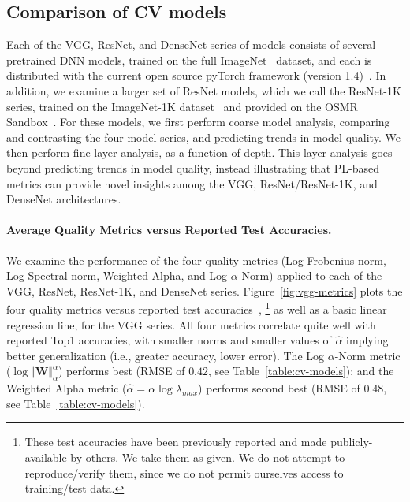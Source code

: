 \subsection{Comparison of CV models}
\label{sxn:cv}

Each of the VGG, ResNet, and DenseNet series of models consists of several pretrained DNN models, trained on the full ImageNet~\cite{imagenet} dataset, and each is distributed with the current open source pyTorch framework (version 1.4)~\cite{pytorch}.
In addition, we examine a larger set of ResNet models, which we call the ResNet-1K series, trained on the ImageNet-1K dataset~\cite{imagenet} and provided on the OSMR Sandbox~\cite{osmr}.
For these models, we first perform coarse model analysis, comparing and contrasting the four model series, and predicting trends in model quality.
We then perform fine layer analysis, as a function of depth.
This layer analysis goes beyond predicting trends in model quality, instead illustrating that PL-based metrics can provide novel insights among the VGG, ResNet/ResNet-1K, and DenseNet architectures. 


\paragraph{Average Quality Metrics versus Reported Test Accuracies.}

We examine the performance of the four quality metrics (Log Frobenius norm, Log Spectral norm, Weighted Alpha, and Log $\alpha$-Norm) applied to each of the VGG, ResNet, ResNet-1K, and DenseNet series.
Figure~\ref{fig:vgg-metrics} 
plots the four quality metrics versus reported test accuracies~\cite{pytorch},%
\footnote{These test accuracies have been previously reported and made publicly-available by others.  We take them as given.  We do not attempt to reproduce/verify them, since we do not permit ourselves access to training/test data.}
as well as a basic linear regression line, for the VGG series.
All four metrics correlate quite well with reported Top1 accuracies, with smaller norms and smaller values of $\hat{\alpha}$ implying better generalization (i.e., greater accuracy, lower error). 
The Log $\alpha$-Norm metric ($\log\Vert\mathbf{W}\Vert_{\alpha}^{\alpha}$) performs best (RMSE of $0.42$, see Table~\ref{table:cv-models}); and the Weighted Alpha metric ($\hat\alpha =\alpha\log\lambda_{max} $) performs second best (RMSE of $0.48$, see Table~\ref{table:cv-models}).


